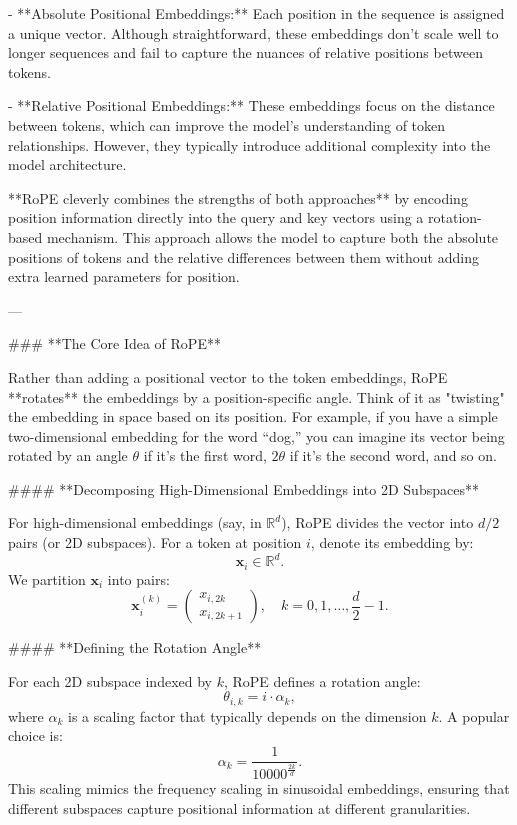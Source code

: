 - **Absolute Positional Embeddings:**  
  Each position in the sequence is assigned a unique vector. Although straightforward, these embeddings don’t scale well to longer sequences and fail to capture the nuances of relative positions between tokens.

- **Relative Positional Embeddings:**  
  These embeddings focus on the distance between tokens, which can improve the model’s understanding of token relationships. However, they typically introduce additional complexity into the model architecture.

**RoPE cleverly combines the strengths of both approaches** by encoding position information directly into the query and key vectors using a rotation-based mechanism. This approach allows the model to capture both the absolute positions of tokens and the relative differences between them without adding extra learned parameters for position.

---

### **The Core Idea of RoPE**

Rather than adding a positional vector to the token embeddings, RoPE **rotates** the embeddings by a position-specific angle. Think of it as "twisting" the embedding in space based on its position. For example, if you have a simple two-dimensional embedding for the word “dog,” you can imagine its vector being rotated by an angle \(\theta\) if it’s the first word, \(2\theta\) if it’s the second word, and so on.

#### **Decomposing High-Dimensional Embeddings into 2D Subspaces**

For high-dimensional embeddings (say, in \(\mathbb{R}^d\)), RoPE divides the vector into \(d/2\) pairs (or 2D subspaces). For a token at position \(i\), denote its embedding by:
\[
\mathbf{x}_i \in \mathbb{R}^d.
\]
We partition \(\mathbf{x}_i\) into pairs:
\[
\mathbf{x}_i^{(k)} = 
\begin{pmatrix}
x_{i,2k} \\
x_{i,2k+1}
\end{pmatrix},\quad k = 0, 1, \ldots, \frac{d}{2}-1.
\]

#### **Defining the Rotation Angle**

For each 2D subspace indexed by \(k\), RoPE defines a rotation angle:
\[
\theta_{i, k} = i \cdot \alpha_k,
\]
where \(\alpha_k\) is a scaling factor that typically depends on the dimension \(k\). A popular choice is:
\[
\alpha_k = \frac{1}{10000^{\frac{2k}{d}}}.
\]
This scaling mimics the frequency scaling in sinusoidal embeddings, ensuring that different subspaces capture positional information at different granularities.

